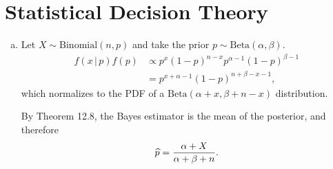 \chapter{Statistical Decision Theory}

\begin{ex}
  \begin{enumerate}[(a)]
    \item Let $X\sim\text{Binomial}(n,p)$ and take the prior
          $p\sim\text{Beta}(\alpha,\beta)$.
          \begin{align*}
            f(x\,|\,p)f(p)
             & \propto
            p^x(1-p)^{n-x}p^{\alpha-1}(1-p)^{\beta-1} \\
             & =p^{x+\alpha-1}(1-p)^{n+\beta-x-1},
          \end{align*}
          which normalizes to the PDF of a $\text{Beta}(\alpha+x,\beta+n-x)$
          distribution.

          By Theorem 12.8, the Bayes estimator is the mean of the posterior, and
          therefore
          \[
            \widehat{p}=\frac{\alpha+X}{\alpha+\beta+n}.
          \]


\end{enumerate}
\end{ex}
